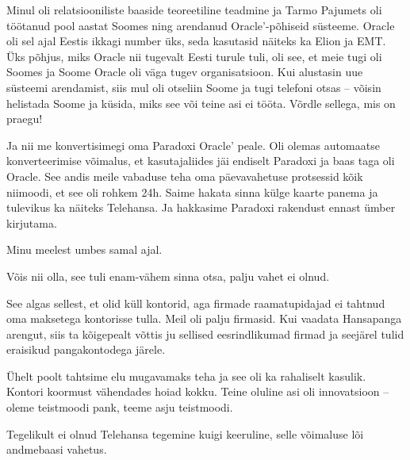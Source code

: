 Minul oli relatsiooniliste baaside teoreetiline 
teadmine ja Tarmo Pajumets oli töötanud pool 
aastat Soomes ning arendanud Oracle'-põhiseid süsteeme. Oracle oli 
sel ajal Eestis ikkagi number üks, seda kasutasid näiteks ka Elion ja EMT. Üks põhjus, miks 
Oracle nii tugevalt Eesti turule tuli, oli see, et meie tugi oli Soomes 
ja Soome Oracle oli väga tugev organisatsioon. Kui alustasin uue süsteemi 
arendamist, siis mul oli otseliin Soome ja tugi telefoni otsas -- võisin helistada Soome ja küsida, miks see või teine asi ei tööta. Võrdle sellega, mis on praegu!

Ja nii me konvertisimegi oma Paradoxi 
Oracle' peale. Oli olemas automaatse konverteerimise võimalus, 
et kasutajaliides jäi endiselt Paradoxi ja baas taga oli Oracle. See andis 
meile vabaduse teha oma päevavahetuse protsessid kõik 
niimoodi, et see oli rohkem 24h. Saime hakata sinna külge kaarte panema ja 
tulevikus ka näiteks Telehansa. Ja hakkasime Paradoxi rakendust ennast ümber 
kirjutama. 


Minu meelest umbes samal ajal.


Võis nii olla, see tuli enam-vähem sinna otsa, palju 
vahet ei olnud. 


See algas sellest, et olid küll kontorid, aga firmade raamatupidajad ei 
tahtnud oma maksetega kontorisse tulla. Meil 
oli palju firmasid. Kui vaadata Hansapanga arengut, siis ta 
kõigepealt võttis ju sellised eesrindlikumad firmad ja seejärel tulid eraisikud 
pangakontodega järele. 

Ühelt poolt tahtsime elu mugavamaks teha ja see oli ka
rahaliselt kasulik. Kontori koormust vähendades hoiad kokku. Teine oluline asi oli
innovatsioon -- oleme teistmoodi pank, 
teeme asju teistmoodi. 


Tegelikult ei olnud Telehansa tegemine kuigi keeruline, selle võimaluse lõi
andmebaasi vahetus. 


